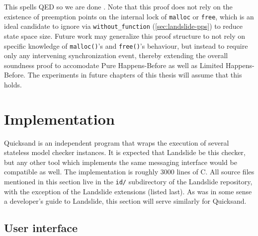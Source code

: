 This spells QED so we are done \cite{vargomax}. %
Note that this proof does not rely on the existence of preemption points on
the internal lock of {\tt malloc} or {\tt free},
which is an ideal candidate to ignore via {\tt without\_function} (\cref{sec:landslide-pps})
to reduce state space size.
Future work may generalize this proof structure to not rely on specific knowledge
of {\tt malloc()}'s and {\tt free()}'s behaviour,
but instead to require only any intervening synchronization event,
thereby extending the overall soundness proof to accomodate Pure Happens-Before as well as Limited Happens-Before.
The experiments in future chapters of this thesis will assume that this holds.


\section{Implementation}
\label{sec:quicksand-implementation}

Quicksand is an independent program that wraps the execution of several stateless model checker instances.
It is expected that Landslide be this checker,
but any other tool which implements the same messaging interface would be compatible as well.
The implementation is roughly 3000 lines of C.
All source files mentioned in this section live in the {\tt id/} subdirectory of the Landslide repository,
with the exception of the Landslide extensions (listed last).
As  was in some sense a developer's guide to Landslide,
this section will serve similarly for Quicksand.

\subsection{User interface}

